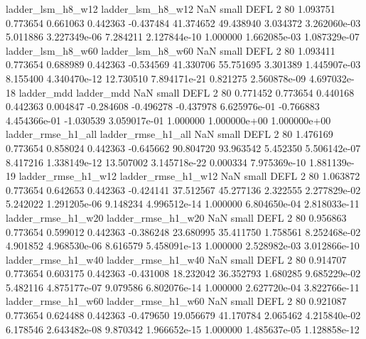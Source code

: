        ladder_lsm_h8_w12        ladder_lsm_h8_w12                   NaN      small     DEFL                 2 80 1.093751       0.773654 0.661063       0.442363   -0.437484     41.374652     49.438940     3.034372   3.262060e-03  5.011886 3.227349e-06     7.284211   2.127844e-10            1.000000    1.662085e-03        1.087329e-07
       ladder_lsm_h8_w60        ladder_lsm_h8_w60                   NaN      small     DEFL                 2 80 1.093411       0.773654 0.688989       0.442363   -0.534569     41.330706     55.751695     3.301389   1.445907e-03  8.155400 4.340470e-12    12.730510   7.894171e-21            0.821275    2.560878e-09        4.697032e-18
              ladder_mdd               ladder_mdd                   NaN      small     DEFL                 2 80 0.771452       0.773654 0.440168       0.442363    0.004847     -0.284608     -0.496278    -0.437978   6.625976e-01 -0.766883 4.454366e-01    -1.030539   3.059017e-01            1.000000    1.000000e+00        1.000000e+00
      ladder_rmse_h1_all       ladder_rmse_h1_all                   NaN      small     DEFL                 2 80 1.476169       0.773654 0.858024       0.442363   -0.645662     90.804720     93.963542     5.452350   5.506142e-07  8.417216 1.338149e-12    13.507002   3.145718e-22            0.000334    7.975369e-10        1.881139e-19
      ladder_rmse_h1_w12       ladder_rmse_h1_w12                   NaN      small     DEFL                 2 80 1.063872       0.773654 0.642653       0.442363   -0.424141     37.512567     45.277136     2.322555   2.277829e-02  5.242022 1.291205e-06     9.148234   4.996512e-14            1.000000    6.804650e-04        2.818033e-11
      ladder_rmse_h1_w20       ladder_rmse_h1_w20                   NaN      small     DEFL                 2 80 0.956863       0.773654 0.599012       0.442363   -0.386248     23.680995     35.411750     1.758561   8.252468e-02  4.901852 4.968530e-06     8.616579   5.458091e-13            1.000000    2.528982e-03        3.012866e-10
      ladder_rmse_h1_w40       ladder_rmse_h1_w40                   NaN      small     DEFL                 2 80 0.914707       0.773654 0.603175       0.442363   -0.431008     18.232042     36.352793     1.680285   9.685229e-02  5.482116 4.875177e-07     9.079586   6.802076e-14            1.000000    2.627720e-04        3.822766e-11
      ladder_rmse_h1_w60       ladder_rmse_h1_w60                   NaN      small     DEFL                 2 80 0.921087       0.773654 0.624488       0.442363   -0.479650     19.056679     41.170784     2.065462   4.215840e-02  6.178546 2.643482e-08     9.870342   1.966652e-15            1.000000    1.485637e-05        1.128858e-12

